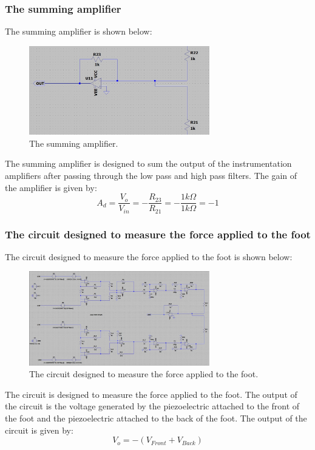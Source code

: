 \subsubsection{The summing amplifier}
The summing amplifier is shown below:
\begin{figure}[H]
    \centering
    \includegraphics[width=0.7\textwidth]{../Report/Figures/2.CircuitDesign/SummingAmplifier.jpg}
    \caption{The summing amplifier.}
\end{figure}
The summing amplifier is designed to sum the output of the instrumentation amplifiers after passing through the low pass and high pass filters. The gain of the amplifier is given by:
\begin{equation}
    A_{d} = \frac{V_{o}}{V_{in}} = - \frac{R_{23}}{R_{21}} = - \frac{1 k\Omega}{1 k\Omega} = -1
\end{equation}


\subsubsection{The circuit designed to measure the force applied to the foot}
The circuit designed to measure the force applied to the foot is shown below:
\begin{figure}[H]
    \centering
    \includegraphics[width=0.7\textwidth]{../Report/Figures/2.CircuitDesign/Circuit.jpg}
    \caption{The circuit designed to measure the force applied to the foot.}
\end{figure}
The circuit is designed to measure the force applied to the foot. The output of the circuit is the voltage generated by the piezoelectric attached to the front of the foot and the piezoelectric attached to the back of the foot. The output of the circuit is given by:
\begin{equation}
    V_{o} = - (V_{Front} + V_{Back})
\end{equation}

